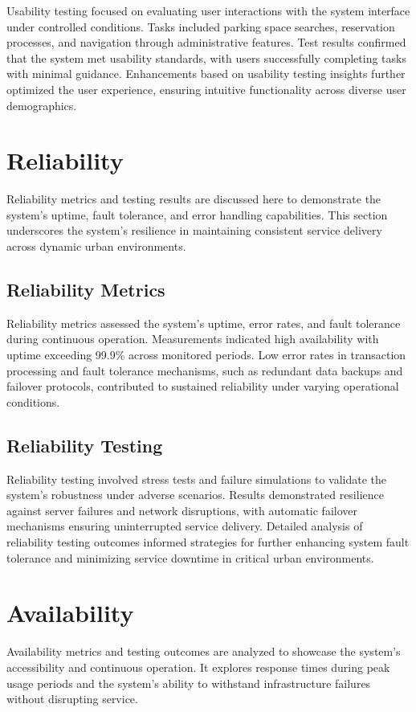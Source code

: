 \documentclass[oneside, 12pt, a4paper, draft]{book}
\begin{document}
Usability testing focused on evaluating user interactions with the system interface under controlled conditions. Tasks included parking space searches, reservation processes, and navigation through administrative features. Test results confirmed that the system met usability standards, with users successfully completing tasks with minimal guidance. Enhancements based on usability testing insights further optimized the user experience, ensuring intuitive functionality across diverse user demographics.
\chapter{Reliability}
\label{sec:orgb45f6e5}
Reliability metrics and testing results are discussed here to demonstrate the system's uptime, fault tolerance, and error handling capabilities. This section underscores the system's resilience in maintaining consistent service delivery across dynamic urban environments.
\section{Reliability Metrics}
\label{sec:org0a75388}

Reliability metrics assessed the system's uptime, error rates, and fault tolerance during continuous operation. Measurements indicated high availability with uptime exceeding 99.9\% across monitored periods. Low error rates in transaction processing and fault tolerance mechanisms, such as redundant data backups and failover protocols, contributed to sustained reliability under varying operational conditions.
\section{Reliability Testing}
\label{sec:orgcd4743f}

Reliability testing involved stress tests and failure simulations to validate the system's robustness under adverse scenarios. Results demonstrated resilience against server failures and network disruptions, with automatic failover mechanisms ensuring uninterrupted service delivery. Detailed analysis of reliability testing outcomes informed strategies for further enhancing system fault tolerance and minimizing service downtime in critical urban environments.
\chapter{Availability}
\label{sec:orgd530f79}
Availability metrics and testing outcomes are analyzed to showcase the system's accessibility and continuous operation. It explores response times during peak usage periods and the system's ability to withstand infrastructure failures without disrupting service.
\end{document}
